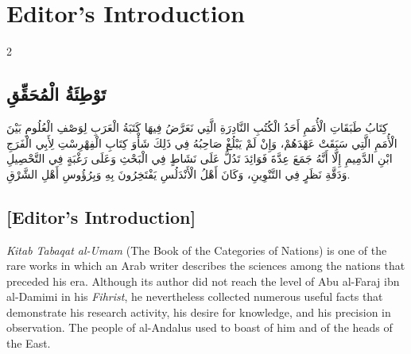 \documentclass[11pt,a4paper]{article}
\newcommand{\ar}[1]{{\arabicfont\beginR #1\endR}}
\begin{document}
\clearpage

\tableofcontents
\clearpage

\section*{Editor's Introduction}

\begin{paracol}{2}
\sloppy

\begin{leftcolumn}
\subsection*{\ar{تَوْطِئَةُ الْمُحَقِّقِ}}
\vspace{0.3cm}
{\arabicfont\beginR
كِتَابُ طَبَقَاتِ الْأُمَمِ أَحَدُ الْكُتُبِ النَّادِرَةِ الَّتِي نَعَرَّضُ فِيهَا كَتَبَةُ الْعَرَبِ لِوَصْفِ الْعُلُومِ بَيْنَ الْأُمَمِ الَّتِي سَبَقَتْ عَهْدَهُمْ، وَإِنْ لَمْ يَبْلُغْ صَاحِبُهُ فِي ذَلِكَ شَأْوَ كِتَابِ الْفِهْرِسْتِ لِأَبِي الْفَرَجِ ابْنِ الدَّمِيمِ إِلَّا أَنَّهُ جَمَعَ عِدَّةَ فَوَائِدَ تَدُلُّ عَلَى نَشَاطٍ فِي الْبَحْثِ وَعَلَى رَغْبَةٍ فِي التَّحْصِيلِ وَدَقَّةِ نَظَرٍ فِي التَّنْوِينِ، وَكَانَ أَهْلُ الْأَنْدَلُسِ يَفْتَخِرُونَ بِهِ وَبِرُؤُوسِ أَهْلِ الشَّرْقِ.
\endR}
\end{leftcolumn}

\begin{rightcolumn}
\subsection*{[Editor's Introduction]}
\vspace{0.3cm}
\textit{Kitab Tabaqat al-Umam} (The Book of the Categories of Nations) is one of the rare works in which an Arab writer describes the sciences among the nations that preceded his era. Although its author did not reach the level of Abu al-Faraj ibn al-Damimi in his \textit{Fihrist}, he nevertheless collected numerous useful facts that demonstrate his research activity, his desire for knowledge, and his precision in observation. The people of al-Andalus used to boast of him and of the heads of the East.
\end{rightcolumn}


\end{paracol}
\end{document}
